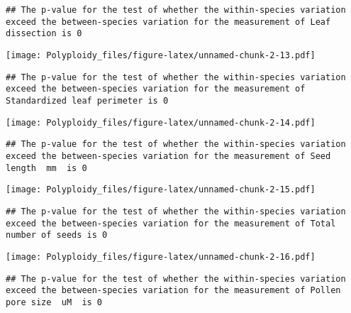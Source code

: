 \documentclass[
]{article}
\begin{document}
\begin{verbatim}
## The p-value for the test of whether the within-species variation exceed the between-species variation for the measurement of Leaf dissection is 0
\end{verbatim}

\texttt{[image: Polyploidy\_files/figure-latex/unnamed-chunk-2-13.pdf]}

\begin{verbatim}
## The p-value for the test of whether the within-species variation exceed the between-species variation for the measurement of Standardized leaf perimeter is 0
\end{verbatim}

\texttt{[image: Polyploidy\_files/figure-latex/unnamed-chunk-2-14.pdf]}

\begin{verbatim}
## The p-value for the test of whether the within-species variation exceed the between-species variation for the measurement of Seed length  mm  is 0
\end{verbatim}

\texttt{[image: Polyploidy\_files/figure-latex/unnamed-chunk-2-15.pdf]}

\begin{verbatim}
## The p-value for the test of whether the within-species variation exceed the between-species variation for the measurement of Total number of seeds is 0
\end{verbatim}

\texttt{[image: Polyploidy\_files/figure-latex/unnamed-chunk-2-16.pdf]}

\begin{verbatim}
## The p-value for the test of whether the within-species variation exceed the between-species variation for the measurement of Pollen pore size  uM  is 0
\end{verbatim}
\end{document}
